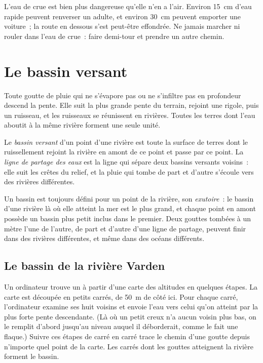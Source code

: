 \begin{safety}
L'eau de crue est bien plus dangereuse qu'elle n'en a l'air. Environ
\qty{15}{cm} d'eau rapide peuvent renverser un adulte, et environ
\qty{30}{cm} peuvent emporter une voiture~; la route en dessous s'est
peut-être effondrée. Ne jamais marcher ni rouler dans l'eau de crue~: faire
demi-tour et prendre un autre chemin.
\end{safety}

\section{Le bassin versant}

Toute goutte de pluie qui ne s'évapore pas ou ne s'infiltre pas en
profondeur descend la pente. Elle suit la plus grande pente du terrain,
rejoint une rigole, puis un ruisseau, et les ruisseaux se réunissent en
rivières. Toutes les terres dont l'eau aboutit à la même rivière forment une
seule unité.

\begin{definition}\label{def:g10:drainage-basins:drainage-basin}
Le \emph{bassin versant} d'un point d'une rivière est
toute la surface de terres dont le ruissellement rejoint la rivière en amont
de ce point et passe par ce point. La
\emph{ligne de partage des eaux} est la ligne qui sépare deux bassins versants voisins~: elle
suit les crêtes du relief, et la pluie qui tombe de part et d'autre
s'écoule vers des rivières différentes.
\end{definition}

Un bassin est toujours défini pour un point de la rivière, son
\emph{exutoire}~: le bassin d'une rivière là où elle atteint la mer est le
plus grand, et chaque point en amont possède un bassin plus petit inclus
dans le premier. Deux gouttes tombées à un mètre l'une de l'autre, de part
et d'autre d'une ligne de partage, peuvent finir dans des rivières
différentes, et même dans des océans différents.

\subsection*{Le bassin de la rivière Varden}

Un ordinateur trouve un  à partir d'une carte des altitudes en
quelques étapes. La carte est découpée en petits carrés, de \qty{50}{m} de
côté ici. Pour chaque carré, l'ordinateur examine ses huit voisins et envoie
l'eau vers celui qu'on atteint par la plus forte pente descendante. (Là où
un petit creux n'a aucun voisin plus bas, on le remplit d'abord jusqu'au
niveau auquel il déborderait, comme le fait une flaque.) Suivre ces étapes
de carré en carré trace le chemin d'une goutte depuis n'importe quel point
de la carte. Les carrés dont les gouttes atteignent la rivière forment le
bassin.

